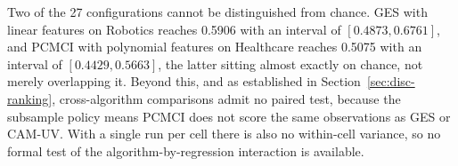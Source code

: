 Two of the 27 configurations cannot be distinguished from chance. GES with linear features on Robotics reaches 0.5906 with an interval of $[0.4873, 0.6761]$, and PCMCI with polynomial features on Healthcare reaches 0.5075 with an interval of $[0.4429, 0.5663]$, the latter sitting almost exactly on chance, not merely overlapping it. Beyond this, and as established in Section~\ref{sec:disc-ranking}, cross-algorithm comparisons admit no paired test, because the subsample policy means PCMCI does not score the same observations as GES or CAM-UV. With a single run per cell there is also no within-cell variance, so no formal test of the algorithm-by-regression interaction is available.
